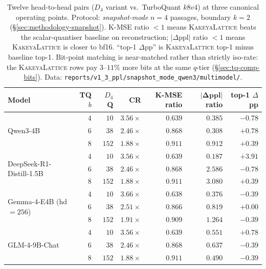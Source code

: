 \documentclass[10pt,a4paper]{article}
\theoremstyle{definition}
\theoremstyle{plain}
\newcommand{\abs}[1]{\left\lvert#1\right\rvert}
\begin{document}
\begin{table}[H]
\centering
\small
\caption{Twelve head-to-head pairs ($D_4$ variant vs.\ TurboQuant
$k8v4$) at three canonical operating points. Protocol:
\emph{snapshot-mode} $n=4$ passages, boundary $k=2$
(\S\ref{sec:methodology-snapshot}). K-MSE ratio $<\!1$ means
\textsc{KakeyaLattice} beats the scalar-quantiser baseline on
reconstruction; $\abs{\Delta\text{ppl}}$ ratio $<\!1$ means
\textsc{KakeyaLattice} is closer to bf16. ``top-1 $\Delta$pp'' is
\textsc{KakeyaLattice} top-1 minus baseline top-1. Bit-point
matching is near-matched rather than strictly iso-rate: the
\textsc{KakeyaLattice} rows pay $3$--$11\%$ more bits at the
same $q$-tier (\S\ref{sec:tq-comp-bits}). Data:
\texttt{reports/v1\_3\_ppl/snapshot\_mode\_qwen3/multimodel/}.}
\label{tab:multimodel}
\begin{tabular}{lrrrrrr}
  \toprule
  Model & TQ $b$ & $D_4$ Q & CR & \textbf{K-MSE ratio} & $\boldsymbol{\abs{\Delta\text{ppl}}}$ \textbf{ratio} & \textbf{top-1 $\Delta$pp} \\
  \midrule
  \multirow{3}{*}{Qwen3-4B}
    & $4$ & $10$  & $3.56\times$ & $\mathbf{0.639}$ & $\mathbf{0.385}$ & $-0.78$ \\
    & $6$ & $38$  & $2.46\times$ & $\mathbf{0.868}$ & $\mathbf{0.308}$ & $+0.78$ \\
    & $8$ & $152$ & $1.88\times$ & $\mathbf{0.911}$ & $\mathbf{0.912}$ & $+0.39$ \\
  \midrule
  \multirow{3}{*}{DeepSeek-R1-Distill-1.5B}
    & $4$ & $10$  & $3.56\times$ & $\mathbf{0.639}$ & $\mathbf{0.187}$ & $+3.91$ \\
    & $6$ & $38$  & $2.46\times$ & $\mathbf{0.868}$ & $2.586$ & $-0.78$ \\
    & $8$ & $152$ & $1.88\times$ & $\mathbf{0.911}$ & $3.080$ & $+0.39$ \\
  \midrule
  \multirow{3}{*}{Gemma-4-E4B (hd $=\!256$)}
    & $4$ & $10$  & $3.66\times$ & $\mathbf{0.638}$ & $\mathbf{0.376}$ & $-0.39$ \\
    & $6$ & $38$  & $2.51\times$ & $\mathbf{0.866}$ & $\mathbf{0.819}$ & $+0.00$ \\
    & $8$ & $152$ & $1.91\times$ & $\mathbf{0.909}$ & $1.264$ & $-0.39$ \\
  \midrule
  \multirow{3}{*}{GLM-4-9B-Chat}
    & $4$ & $10$  & $3.56\times$ & $\mathbf{0.639}$ & $\mathbf{0.551}$ & $+0.78$ \\
    & $6$ & $38$  & $2.46\times$ & $\mathbf{0.868}$ & $\mathbf{0.637}$ & $-0.39$ \\
    & $8$ & $152$ & $1.88\times$ & $\mathbf{0.911}$ & $\mathbf{0.490}$ & $-0.39$ \\
  \bottomrule
\end{tabular}
\end{table}
\end{document}
